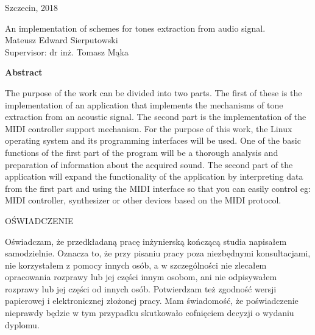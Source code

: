 \begin{titlepage}
\begin{flushleft}
\end{flushleft}

\begin{center}
   \vspace{1.0 cm}
   {\large Szczecin, {2018}}
   \vfill                         %
\end{center}

\end{titlepage}

\pagebreak

\begin{titlepage}

\begin{center}
\vspace{2.cm}                   
\LARGE {An implementation of schemes for tones extraction from audio signal.} \\ 
\vspace{1cm}                   
\large {Mateusz Edward Sierputowski}\\
\large Supervisor: { dr inż. Tomasz Mąka}\\
\vspace{1cm}
\end{center}

\textbf{Abstract}
\vspace{12pt}
 
The purpose of the work can be divided into two parts. The first of these is the implementation of an application that implements the mechanisms of tone extraction from an acoustic signal. The second part is the implementation of the MIDI controller support mechanism. For the purpose of this work, the Linux operating system and its programming interfaces will be used. One of the basic functions of the first part of the program will be a thorough analysis and preparation of information about the acquired sound. The second part of the application will expand the functionality of the application by interpreting data from the first part and using the MIDI interface so that you can easily control eg: MIDI controller, synthesizer or other devices based on the MIDI protocol.

\end{titlepage}

\pagebreak

\begin{center}
\large
\vspace{3 cm}
OŚWIADCZENIE 
\end{center} 
 
Oświadczam, że przedkładaną pracę inżynierską kończącą studia napisałem samodzielnie.
Oznacza to, że przy pisaniu pracy poza niezbędnymi konsultacjami, nie korzystałem z
pomocy innych osób, a w szczególności nie zlecałem opracowania rozprawy lub jej części 
innym osobom, ani nie odpisywałem rozprawy lub jej części od innych osób. Potwierdzam też
zgodność wersji papierowej i elektronicznej złożonej pracy. Mam świadomość, że poświadczenie nieprawdy
będzie w tym przypadku skutkowało cofnięciem decyzji o wydaniu dyplomu.  


\thispagestyle {empty}